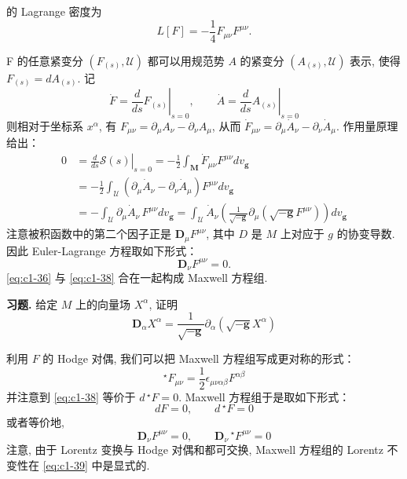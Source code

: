 的 Lagrange 密度为
\[
L[F] = -\frac{1}{4}F_{\mu\nu}F^{\mu\nu}.
\]

F 的任意紧变分 $(F_{(s)}, \mathcal{U})$ 都可以用规范势 $A$ 的紧变分 $(A_{(s)}, \mathcal{U})$ 表示, 使得 $F_{(s)} = dA_{(s)}$. 记
\[
\dot{F} = \left.\frac{d}{ds}F_{(s)}\right|_{s=0}, \qquad \dot{A} = \left.\frac{d}{ds}A_{(s)}\right|_{s=0}
\]
则相对于坐标系 $x^\alpha$, 有 $F_{\mu\nu} = \partial_\mu A_\nu - \partial_\nu A_\mu$, 从而 $\dot{F}_{\mu\nu} = \partial_\mu\dot{A}_\nu - \partial_\nu\dot{A}_\mu$. 作用量原理给出：
\[
\begin{aligned}
0 &= \left.\frac{d}{ds}\mathcal{S}(s)\right|_{s=0} = -\frac{1}{2}\int_{\mathbf{M}}\dot{F}_{\mu\nu}F^{\mu\nu}dv_{\mathbf{g}}\\
&= -\frac{1}{2}\int_{\mathcal{U}}(\partial_\mu\dot{A}_\nu - \partial_\nu\dot{A}_\mu)F^{\mu\nu}dv_{\mathbf{g}}\\
&= -\int_{\mathcal{U}}\partial_\mu\dot{A}_\nu\, F^{\mu\nu}dv_{\mathbf{g}} = \int_{\mathcal{U}}\dot{A}_\nu\left(\frac{1}{\sqrt{-\mathbf{g}}}\partial_\mu\left(\sqrt{-\mathbf{g}}F^{\mu\nu}\right)\right)dv_{\mathbf{g}}
\end{aligned}
\]
注意被积函数中的第二个因子正是 $\mathbf{D}_\mu F^{\mu\nu}$, 其中 $D$ 是 $M$ 上对应于 $g$ 的协变导数. 因此 Euler-Lagrange 方程取如下形式：
\begin{equation}
\mathbf{D}_\nu F^{\mu\nu} = 0.\label{eq:c1-38}
\end{equation}
\eqref{eq:c1-36} 与 \eqref{eq:c1-38} 合在一起构成 Maxwell 方程组. 

\textbf{习题.} 给定 $M$ 上的向量场 $X^\alpha$, 证明
\[
\mathbf{D}_\alpha X^\alpha = \frac{1}{\sqrt{-\mathbf{g}}}\partial_\alpha\left(\sqrt{-\mathbf{g}}X^\alpha\right)
\]

利用 $F$ 的 Hodge 对偶, 我们可以把 Maxwell 方程组写成更对称的形式：
\[
{}^\star F_{\mu\nu} = \frac{1}{2}\epsilon_{\mu\nu\alpha\beta}F^{\alpha\beta}
\]
并注意到 \eqref{eq:c1-38} 等价于 $d\, {}^\star F = 0$. Maxwell 方程组于是取如下形式：
\begin{equation}
dF = 0, \qquad d\, {}^\star F = 0\label{eq:c1-39}
\end{equation}
或者等价地, 
\begin{equation}
\mathbf{D}_\nu F^{\mu\nu} = 0, \qquad \mathbf{D}_\nu\, {}^\star F^{\mu\nu} = 0\label{eq:c1-40}
\end{equation}
注意, 由于 Lorentz 变换与 Hodge 对偶和都可交换, Maxwell 方程组的 Lorentz 不变性在 \eqref{eq:c1-39} 中是显式的. 

